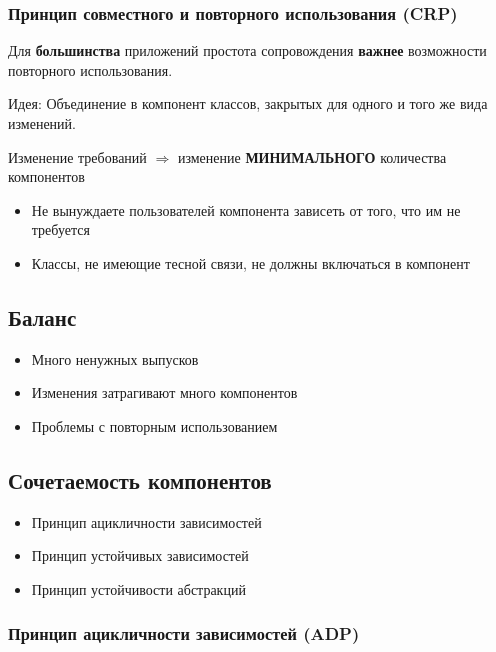 \subsubsection{Принцип совместного и повторного использования (CRP)}

Для \textbf{большинства} приложений простота сопровождения
\textbf{важнее} возможности повторного использования.

Идея: Объединение в компонент классов, закрытых для одного и того же
вида изменений.

Изменение требований $\Rightarrow$ изменение \textbf{МИНИМАЛЬНОГО}
количества компонентов

\begin{itemize}
    \item Не вынуждаете пользователей компонента зависеть от
        того, что им не требуется
    \item Классы, не имеющие тесной связи, не должны включаться
        в компонент
\end{itemize}

\subsection{Баланс}

\begin{itemize}
    \item Много ненужных выпусков
    \item Изменения затрагивают много компонентов
    \item Проблемы с повторным использованием
\end{itemize}

\subsection{Сочетаемость компонентов}

\begin{itemize}
    \item Принцип ацикличности зависимостей
    \item Принцип устойчивых зависимостей
    \item Принцип устойчивости абстракций
\end{itemize}

\subsubsection{Принцип ацикличности зависимостей (ADP)}


